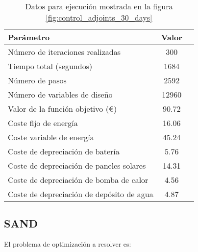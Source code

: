 \begin{table}[ht]
	\centering
	\caption{Datos para ejecución mostrada en la figura \ref{fig:control_adjoints_30_days}}
	\label{tab:control_adjoints_30_days}
	\begin{tabular}{@{}lcc@{}}
		\toprule
		Parámetro                                 & Valor \\
		\midrule
		Número de iteraciones realizadas          & 300   \\
		Tiempo total (segundos)                   & 1684  \\
		Número de pasos                           & 2592  \\
		Número de variables de diseño             & 12960 \\
		\midrule
		Valor de la función objetivo (€)          & 90.72 \\
		\midrule
		Coste fijo de energía                     & 16.06 \\
		Coste variable de energía                 & 45.24 \\
		Coste de depreciación de batería          & 5.76  \\
		Coste de depreciación de paneles solares  & 14.31 \\
		Coste de depreciación de bomba de calor   & 4.56  \\
		Coste de depreciación de depósito de agua & 4.87  \\
		\bottomrule
	\end{tabular}
\end{table}





\clearpage
\subsection{SAND}

El problema de optimización a resolver es:

